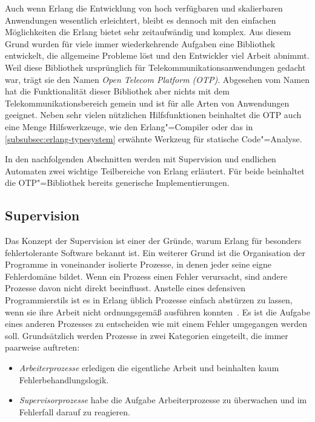 Auch wenn Erlang die Entwicklung von hoch verfügbaren und skalierbaren Anwendungen wesentlich erleichtert, bleibt es dennoch mit den einfachen Möglichkeiten die Erlang bietet sehr zeitaufwändig und komplex. Aus diesem Grund wurden für viele immer wiederkehrende Aufgaben eine Bibliothek entwickelt, die allgemeine Probleme löst und den Entwickler viel Arbeit abnimmt.  Weil diese Bibliothek ursprünglich für Telekommunikationsanwendungen gedacht war, trägt sie den Namen \textit{Open Telecom Platform (OTP)}. Abgesehen vom Namen hat die Funktionalität dieser Bibliothek aber nichts mit dem Telekommunikationsbereich gemein und ist für alle Arten von Anwendungen geeignet. Neben sehr vielen nützlichen Hilfsfunktionen beinhaltet die OTP auch eine Menge Hilfswerkzeuge, wie \zB den Erlang"=Compiler oder das in \ref{subsubsec:erlang-typesystem} erwähnte Werkzeug für statische Code"=Analyse.

In den nachfolgenden Abschnitten werden mit Supervision und endlichen Automaten zwei wichtige Teilbereiche von Erlang erläutert. Für beide beinhaltet die OTP"=Bibliothek bereits generische Implementierungen. 

\subsection{Supervision}
\label{subsec:erlang-supervision}

Das Konzept der Supervision ist einer der Gründe, warum 
Erlang für besonders fehlertolerante Software bekannt ist. Ein weiterer Grund ist die Organisation der Programme in voneinander isolierte Prozesse, in denen jeder seine eigne Fehlerdomäne bildet. Wenn ein Prozess einen Fehler verursacht, sind andere Prozesse davon nicht direkt beeinflusst. Anstelle eines defensiven Programmierstils ist es in Erlang üblich Prozesse einfach abstürzen zu lassen, wenn sie ihre Arbeit nicht ordnungsgemäß ausführen konnten~\cite[104]{armstrong03}. Es ist die Aufgabe eines anderen Prozesses zu entscheiden wie mit einem Fehler umgegangen werden soll. Grundsätzlich werden Prozesse in zwei Kategorien eingeteilt, die immer paarweise auftreten:

\begin{itemize}
	\item \textit{Arbeiterprozesse} erledigen die eigentliche Arbeit und beinhalten kaum Fehlerbehandlungslogik.
	\item \textit{Supervisorprozesse} habe die Aufgabe Arbeiterprozesse zu überwachen und im Fehlerfall darauf zu reagieren.
\end{itemize}

